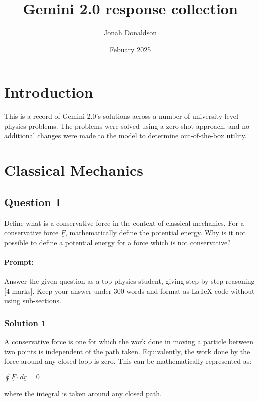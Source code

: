 \documentclass{article}
\title{Gemini 2.0 response collection}
\author{Jonah Donaldson}
\date{Febuary 2025}
\begin{document}
\maketitle

\tableofcontents
\newpage

\section{Introduction}

This is a record of Gemini 2.0's solutions across a number of university-level physics problems. The problems were solved using a zero-shot approach, and no additional changes were made to the model to determine out-of-the-box utility.

\section{Classical Mechanics}

\subsection{Question 1}
Define what is a conservative force in the context of classical mechanics. For a conservative force
$\underline{F}$, mathematically define the potential energy. Why is it not possible to define a potential energy
for a force which is not conservative?

\paragraph{Prompt: \\} 
Answer the given question as a top physics student, giving step-by-step reasoning [4 marks]. Keep your answer under 300 words and format as LaTeX code without using sub-sections. 

\subsubsection{Solution 1}
A conservative force is one for which the work done in moving a particle between two points is independent of the path taken. Equivalently, the work done by the force around any closed loop is zero. This can be mathematically represented as:

$\oint \underline{F} \cdot d\underline{r} = 0$

where the integral is taken around any closed path.
\\
\end{document}
